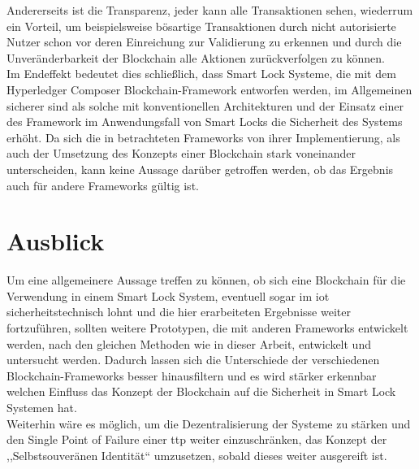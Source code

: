     Andererseits ist die Transparenz, jeder kann alle Transaktionen sehen, wiederrum ein Vorteil, um beispielsweise bösartige Transaktionen durch nicht autorisierte Nutzer schon vor deren Einreichung zur Validierung zu erkennen und durch die Unveränderbarkeit der Blockchain alle Aktionen zurückverfolgen zu können.
    \medskip\\
    Im Endeffekt bedeutet dies schließlich, dass Smart Lock Systeme, die mit dem Hyperledger Composer Blockchain-Framework entworfen werden, im Allgemeinen sicherer sind als solche mit konventionellen Architekturen und der Einsatz einer des Framework im Anwendungsfall von Smart Locks die Sicherheit des Systems erhöht.
    \newpage
    \indent Da sich die in  betrachteten Frameworks von ihrer Implementierung, als auch der Umsetzung des Konzepts einer Blockchain stark voneinander unterscheiden, kann keine Aussage darüber getroffen werden, ob das Ergebnis auch für andere Frameworks gültig ist.
    
\section{Ausblick}
\label{sec:end_further}
    Um eine allgemeinere Aussage treffen zu können, ob sich eine Blockchain für die Verwendung in einem Smart Lock System, eventuell sogar im \gls{iot} sicherheitstechnisch lohnt und die hier erarbeiteten Ergebnisse weiter fortzuführen, sollten weitere Prototypen, die mit anderen Frameworks entwickelt werden, nach den gleichen Methoden wie in dieser Arbeit, entwickelt und untersucht werden. 
    Dadurch lassen sich die Unterschiede der verschiedenen Blockchain-Frameworks besser hinausfiltern und es wird stärker erkennbar welchen Einfluss das Konzept der Blockchain auf die Sicherheit in Smart Lock Systemen hat. 
    \medskip\\
    Weiterhin wäre es möglich, um die Dezentralisierung der Systeme zu stärken und den Single Point of Failure einer \gls{ttp} weiter einzuschränken, das Konzept der ,,Selbstsouveränen Identität``\cite{Sherriff2017,W3C} umzusetzen, sobald dieses weiter ausgereift ist. 
